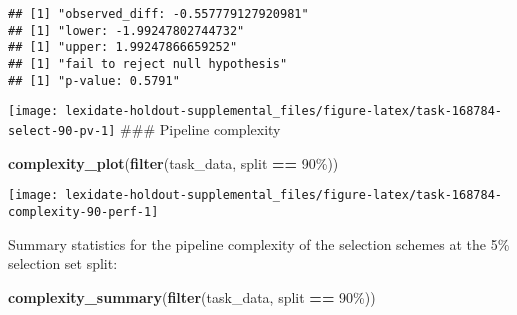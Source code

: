 \documentclass[
]{book}
\newenvironment{Shaded}{\begin{snugshade}}{\end{snugshade}}
\newcommand{\AttributeTok}[1]{\textcolor[rgb]{0.13,0.29,0.53}{#1}}
\newcommand{\DecValTok}[1]{\textcolor[rgb]{0.00,0.00,0.81}{#1}}
\newcommand{\FunctionTok}[1]{\textcolor[rgb]{0.13,0.29,0.53}{\textbf{#1}}}
\newcommand{\NormalTok}[1]{#1}
\newcommand{\OtherTok}[1]{\textcolor[rgb]{0.56,0.35,0.01}{#1}}
\newcommand{\SpecialCharTok}[1]{\textcolor[rgb]{0.81,0.36,0.00}{\textbf{#1}}}
\newcommand{\StringTok}[1]{\textcolor[rgb]{0.31,0.60,0.02}{#1}}
\begin{document}
\begin{Shaded}
\end{Shaded}

\begin{verbatim}
## [1] "observed_diff: -0.557779127920981"
## [1] "lower: -1.99247802744732"
## [1] "upper: 1.99247866659252"
## [1] "fail to reject null hypothesis"
## [1] "p-value: 0.5791"
\end{verbatim}

\texttt{[image: lexidate-holdout-supplemental\_files/figure-latex/task-168784-select-90-pv-1]}
\#\#\# Pipeline complexity

\begin{Shaded}
\begin{Highlighting}[]
\FunctionTok{complexity\_plot}\NormalTok{(}\FunctionTok{filter}\NormalTok{(task\_data, split }\SpecialCharTok{==} \StringTok{\textquotesingle{}90\%\textquotesingle{}}\NormalTok{))}
\end{Highlighting}
\end{Shaded}

\texttt{[image: lexidate-holdout-supplemental\_files/figure-latex/task-168784-complexity-90-perf-1]}

Summary statistics for the pipeline complexity of the selection schemes at the 5\% selection set split:

\begin{Shaded}
\begin{Highlighting}[]
\FunctionTok{complexity\_summary}\NormalTok{(}\FunctionTok{filter}\NormalTok{(task\_data, split }\SpecialCharTok{==} \StringTok{\textquotesingle{}90\%\textquotesingle{}}\NormalTok{))}
\end{Highlighting}
\end{Shaded}
\end{document}
